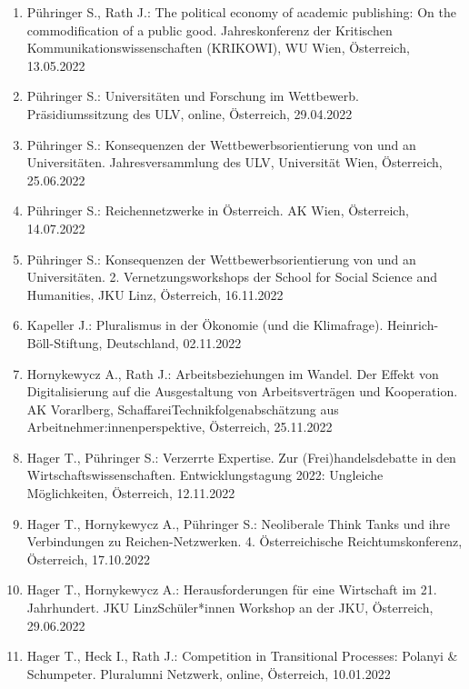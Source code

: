 \begin{enumerate}
	\item Pühringer S., Rath J.: The political economy of academic publishing: On the commodification of a public good. Jahreskonferenz der Kritischen Kommunikationswissenschaften (KRIKOWI), WU Wien, Österreich, 13.05.2022
	\item Pühringer S.: Universitäten und Forschung im Wettbewerb. Präsidiumssitzung des ULV, online, Österreich, 29.04.2022
	\item Pühringer S.: Konsequenzen der Wettbewerbsorientierung von und an Universitäten. Jahresversammlung des ULV, Universität Wien, Österreich, 25.06.2022
	\item Pühringer S.: Reichennetzwerke in Österreich. AK Wien, Österreich, 14.07.2022
	\item Pühringer S.: Konsequenzen der Wettbewerbsorientierung von und an Universitäten. 2. Vernetzungsworkshops der School for Social Science and Humanities, JKU Linz, Österreich, 16.11.2022
	\item Kapeller J.: Pluralismus in der Ökonomie (und die Klimafrage). Heinrich-Böll-Stiftung, Deutschland, 02.11.2022
	\item Hornykewycz A., Rath J.: Arbeitsbeziehungen im Wandel. Der Effekt von Digitalisierung auf die Ausgestaltung von Arbeitsverträgen und Kooperation. AK Vorarlberg, SchaffareiTechnikfolgenabschätzung aus Arbeitnehmer:innenperspektive, Österreich, 25.11.2022
	\item Hager T., Pühringer S.: Verzerrte Expertise. Zur (Frei)handelsdebatte in den Wirtschaftswissenschaften. Entwicklungstagung 2022: Ungleiche Möglichkeiten, Österreich, 12.11.2022
	\item Hager T., Hornykewycz A., Pühringer S.: Neoliberale Think Tanks und ihre Verbindungen zu Reichen-Netzwerken. 4. Österreichische Reichtumskonferenz, Österreich, 17.10.2022
	\item Hager T., Hornykewycz A.: Herausforderungen für eine Wirtschaft im 21. Jahrhundert. JKU LinzSchüler*innen Workshop an der JKU, Österreich, 29.06.2022
	\item Hager T., Heck I., Rath J.: Competition in Transitional Processes: Polanyi \& Schumpeter. Pluralumni Netzwerk, online, Österreich, 10.01.2022
\end{enumerate}

